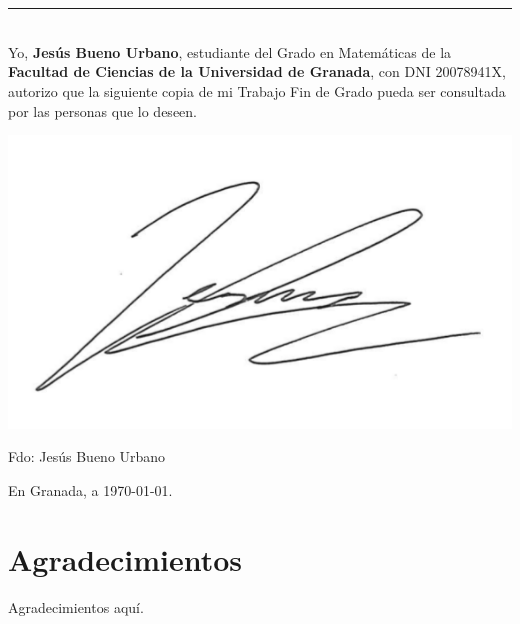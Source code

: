 


\chapter*{}
\thispagestyle{empty}

\noindent\rule[-1ex]{\textwidth}{2pt}\\[4.5ex]

Yo, \textbf{Jesús Bueno Urbano}, estudiante del Grado en Matemáticas de la \textbf{Facultad de Ciencias de la Universidad de Granada}, con DNI 20078941X, autorizo que la siguiente copia de mi Trabajo Fin de Grado pueda ser consultada por las personas que lo deseen.

\vspace{2cm}

\includegraphics[scale=0.3]{images/firma.png}

\vspace{1cm}

\noindent Fdo: Jesús Bueno Urbano

\vspace{2cm}

\begin{flushright}
En Granada, a \today.
\end{flushright}


\chapter*{Agradecimientos}
\thispagestyle{empty}

       \vspace{1cm}


Agradecimientos aquí.